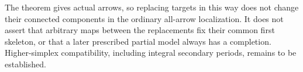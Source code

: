 The theorem gives actual arrows, so replacing targets in
this way does not change their connected components in the
ordinary all-arrow localization. It does not assert that
arbitrary maps between the replacements fix their common
first skeleton, or that a later prescribed partial model
always has a completion. Higher-simplex compatibility,
including integral secondary periods, remains to be established.
